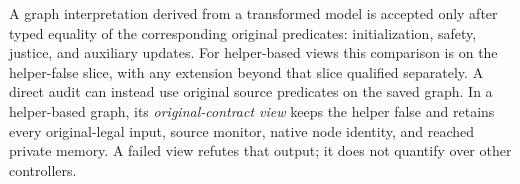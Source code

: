 A graph interpretation derived from a transformed model is accepted only
after typed equality of the corresponding original predicates: initialization,
safety, justice, and auxiliary updates. For helper-based views this comparison
is on the helper-false slice, with any extension beyond that slice
qualified separately.
A direct audit can instead use original source predicates on the saved
graph. In a helper-based graph, its \emph{original-contract view} keeps
the helper false and retains every original-legal input, source monitor,
native node identity, and reached private memory. A failed view refutes
that output; it does not quantify over other controllers.
